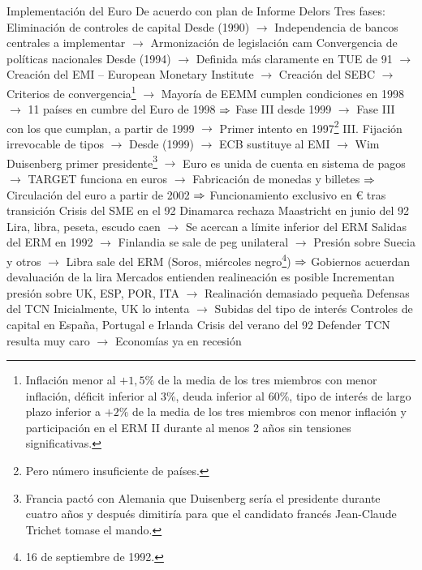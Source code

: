 \documentclass{nuevotema}
\begin{document}
\begin{esquemal}
			\3 Implementación del Euro
				\4 De acuerdo con plan de Informe Delors
				\4[] Tres fases:
				\4[I.] Eliminación de controles de capital
				\4[] Desde (1990)
				\4[] $\to$ Independencia de bancos centrales a implementar
				\4[] $\to$ Armonización de legislación cam
				\4[II.] Convergencia de políticas nacionales
				\4[] Desde (1994)
				\4[] $\to$ Definida más claramente en TUE de 91
				\4[] $\to$ Creación del EMI -- European Monetary Institute
				\4[] $\to$ Creación del SEBC
				\4[] $\to$ Criterios de convergencia\footnote{Inflación menor al $+1,5\%$ de la media de los tres miembros con menor inflación, déficit inferior al 3\%, deuda inferior al $60\%$, tipo de interés de largo plazo inferior a $+2\%$ de la media de los tres miembros con menor inflación y participación en el ERM II durante al menos 2 años sin tensiones significativas.}
				\4[] $\to$ Mayoría de EEMM cumplen condiciones en 1998
				\4[] $\to$ 11 países en cumbre del Euro de 1998
				\4[] $\Rightarrow$ Fase III desde 1999
				\4[] $\to$ Fase III con los que cumplan, a partir de 1999
				\4[] $\to$ Primer intento en 1997\footnote{Pero número insuficiente de países.}
				\4[] III. Fijación irrevocable de tipos
				\4[] $\to$ Desde (1999)
				\4[] $\to$ ECB sustituye al EMI
				\4[] $\to$ Wim Duisenberg primer presidente\footnote{Francia pactó con Alemania que Duisenberg sería el presidente durante cuatro años y después dimitiría para que el candidato francés Jean-Claude Trichet tomase el mando.}
				\4[] $\to$ Euro es unida de cuenta en sistema de pagos
				\4[] $\to$ TARGET funciona en euros
				\4[] $\to$ Fabricación de monedas y billetes
				\4[] $\Rightarrow$ Circulación del euro a partir de 2002
				\4[] $\Rightarrow$ Funcionamiento exclusivo en € tras transición
			\3 Crisis del SME en el 92
				\4 Dinamarca rechaza Maastricht en junio del 92
				\4[] Lira, libra, peseta, escudo caen
				\4[] $\to$ Se acercan a límite inferior del ERM
				\4 Salidas del ERM en 1992
				\4[] $\to$ Finlandia se sale de peg unilateral
				\4[] $\to$ Presión sobre Suecia y otros
				\4[] $\to$ Libra sale del ERM (Soros, miércoles negro\footnote{16 de septiembre de 1992.})
				\4[] $\Rightarrow$ Gobiernos acuerdan devaluación de la lira
				\4 Mercados entienden realineación es posible
				\4[] Incrementan presión sobre UK, ESP, POR, ITA
				\4[] $\to$ Realinación demasiado pequeña
				\4 Defensas del TCN
				\4[] Inicialmente, UK lo intenta
				\4[] $\to$ Subidas del tipo de interés
				\4[] Controles de capital en España, Portugal e Irlanda
				\4 Crisis del verano del 92
				\4[] Defender TCN resulta muy caro
				\4[] $\to$ Economías ya en recesión

\end{esquemal}
\end{document}
